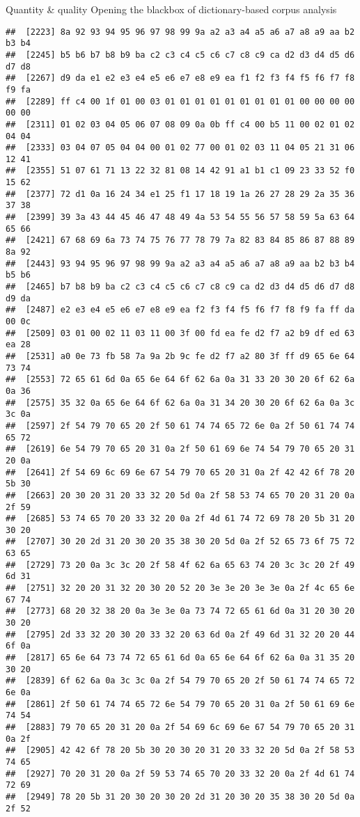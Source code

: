 \documentclass[
  ignorenonframetext,
]{beamer}
\begin{document}
\begin{frame}[fragile]{Quantity \& quality \textbar{} Opening the
blackbox of dictionary-based corpus analysis}
\begin{verbatim}
##  [2223] 8a 92 93 94 95 96 97 98 99 9a a2 a3 a4 a5 a6 a7 a8 a9 aa b2 b3 b4
##  [2245] b5 b6 b7 b8 b9 ba c2 c3 c4 c5 c6 c7 c8 c9 ca d2 d3 d4 d5 d6 d7 d8
##  [2267] d9 da e1 e2 e3 e4 e5 e6 e7 e8 e9 ea f1 f2 f3 f4 f5 f6 f7 f8 f9 fa
##  [2289] ff c4 00 1f 01 00 03 01 01 01 01 01 01 01 01 01 00 00 00 00 00 00
##  [2311] 01 02 03 04 05 06 07 08 09 0a 0b ff c4 00 b5 11 00 02 01 02 04 04
##  [2333] 03 04 07 05 04 04 00 01 02 77 00 01 02 03 11 04 05 21 31 06 12 41
##  [2355] 51 07 61 71 13 22 32 81 08 14 42 91 a1 b1 c1 09 23 33 52 f0 15 62
##  [2377] 72 d1 0a 16 24 34 e1 25 f1 17 18 19 1a 26 27 28 29 2a 35 36 37 38
##  [2399] 39 3a 43 44 45 46 47 48 49 4a 53 54 55 56 57 58 59 5a 63 64 65 66
##  [2421] 67 68 69 6a 73 74 75 76 77 78 79 7a 82 83 84 85 86 87 88 89 8a 92
##  [2443] 93 94 95 96 97 98 99 9a a2 a3 a4 a5 a6 a7 a8 a9 aa b2 b3 b4 b5 b6
##  [2465] b7 b8 b9 ba c2 c3 c4 c5 c6 c7 c8 c9 ca d2 d3 d4 d5 d6 d7 d8 d9 da
##  [2487] e2 e3 e4 e5 e6 e7 e8 e9 ea f2 f3 f4 f5 f6 f7 f8 f9 fa ff da 00 0c
##  [2509] 03 01 00 02 11 03 11 00 3f 00 fd ea fe d2 f7 a2 b9 df ed 63 ea 28
##  [2531] a0 0e 73 fb 58 7a 9a 2b 9c fe d2 f7 a2 80 3f ff d9 65 6e 64 73 74
##  [2553] 72 65 61 6d 0a 65 6e 64 6f 62 6a 0a 31 33 20 30 20 6f 62 6a 0a 36
##  [2575] 35 32 0a 65 6e 64 6f 62 6a 0a 31 34 20 30 20 6f 62 6a 0a 3c 3c 0a
##  [2597] 2f 54 79 70 65 20 2f 50 61 74 74 65 72 6e 0a 2f 50 61 74 74 65 72
##  [2619] 6e 54 79 70 65 20 31 0a 2f 50 61 69 6e 74 54 79 70 65 20 31 20 0a
##  [2641] 2f 54 69 6c 69 6e 67 54 79 70 65 20 31 0a 2f 42 42 6f 78 20 5b 30
##  [2663] 20 30 20 31 20 33 32 20 5d 0a 2f 58 53 74 65 70 20 31 20 0a 2f 59
##  [2685] 53 74 65 70 20 33 32 20 0a 2f 4d 61 74 72 69 78 20 5b 31 20 30 20
##  [2707] 30 20 2d 31 20 30 20 35 38 30 20 5d 0a 2f 52 65 73 6f 75 72 63 65
##  [2729] 73 20 0a 3c 3c 20 2f 58 4f 62 6a 65 63 74 20 3c 3c 20 2f 49 6d 31
##  [2751] 32 20 20 31 32 20 30 20 52 20 3e 3e 20 3e 3e 0a 2f 4c 65 6e 67 74
##  [2773] 68 20 32 38 20 0a 3e 3e 0a 73 74 72 65 61 6d 0a 31 20 30 20 30 20
##  [2795] 2d 33 32 20 30 20 33 32 20 63 6d 0a 2f 49 6d 31 32 20 20 44 6f 0a
##  [2817] 65 6e 64 73 74 72 65 61 6d 0a 65 6e 64 6f 62 6a 0a 31 35 20 30 20
##  [2839] 6f 62 6a 0a 3c 3c 0a 2f 54 79 70 65 20 2f 50 61 74 74 65 72 6e 0a
##  [2861] 2f 50 61 74 74 65 72 6e 54 79 70 65 20 31 0a 2f 50 61 69 6e 74 54
##  [2883] 79 70 65 20 31 20 0a 2f 54 69 6c 69 6e 67 54 79 70 65 20 31 0a 2f
##  [2905] 42 42 6f 78 20 5b 30 20 30 20 31 20 33 32 20 5d 0a 2f 58 53 74 65
##  [2927] 70 20 31 20 0a 2f 59 53 74 65 70 20 33 32 20 0a 2f 4d 61 74 72 69
##  [2949] 78 20 5b 31 20 30 20 30 20 2d 31 20 30 20 35 38 30 20 5d 0a 2f 52

\end{verbatim}
\end{frame}
\end{document}
